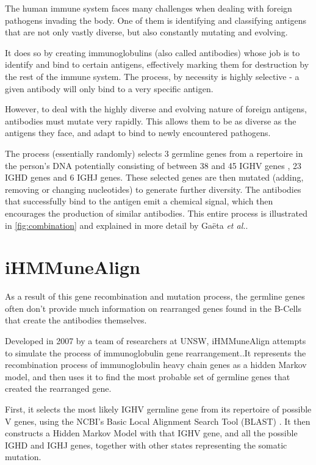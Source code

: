 The human immune system faces many challenges when dealing with foreign pathogens invading the body. One of them is identifying and classifying antigens that are not only vastly diverse, but also constantly mutating and evolving.

It does so by creating immunoglobulins (also called antibodies) whose job is to identify and bind to certain antigens, effectively marking them for destruction by the rest of the immune system. The process, by necessity is highly selective - a given antibody will only bind to a very specific antigen.

However, to deal with the highly diverse and evolving nature of foreign antigens, antibodies must mutate very rapidly. This allows them to be as diverse as the antigens they face, and adapt to bind to newly encountered pathogens.

The process (essentially randomly) selects 3 germline genes from a repertoire in the person's DNA  potentially consisting of between 38 and 45 IGHV genes \autocite{lefranc05, li02}, 23 IGHD genes \autocite{lee06} and 6 IGHJ \autocite{ravetch81} genes. These selected genes are then mutated (adding, removing or changing nucleotides) to generate further diversity. The antibodies that successfully bind to the antigen emit a chemical signal, which then encourages the production of similar antibodies. This entire process is illustrated in \autoref{fig:combination} and explained in more detail by Ga\"{e}ta \textit{et al.}\autocite{iHMMuneAlign}.

\section{iHMMuneAlign}

As a result of this gene recombination and mutation process, the germline genes often don't provide much information on rearranged genes found in the B-Cells that create the antibodies themselves.

Developed in 2007 by a team of researchers at UNSW, iHMMuneAlign attempts to simulate the process of immunoglobulin gene rearrangement.\autocite{iHMMuneAlign}.It represents the recombination process of immunoglobulin heavy chain genes as a hidden Markov model, and then uses it to find the most probable set of germline genes that created the rearranged gene.

First, it selects the most likely IGHV germline gene from its repertoire of possible V genes, using the NCBI's Basic Local Alignment Search Tool (BLAST) \autocite{blast}. It then constructs a Hidden Markov Model with that IGHV gene, and all the possible IGHD and IGHJ genes, together with other states representing the somatic mutation.

